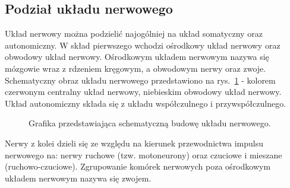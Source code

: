 \documentclass[twoside,a4paper]{book}
\begin{document}
\subsection{Podział układu nerwowego}
Układ nerwowy można podzielić najogólniej na układ somatyczny oraz autonomiczny. W skład pierwszego wchodzi ośrodkowy układ nerwowy oraz obwodowy układ nerwowy. Ośrodkowym układem nerwowym nazywa się mózgowie wraz z rdzeniem kręgowym, a obwodowym nerwy oraz zwoje. Schematyczny obraz układu nerwowego przedstawiono na rys.~\ref{fig:nervesystem} - kolorem czerwonym centralny układ nerwowy, niebieskim obwodowy układ nerwowy. Układ autonomiczny składa się z układu współczulnego i przywspółczulnego. \\
\begin{figure}[!h]

		\centering		
		\caption{Grafika przedstawiająca schematyczną budowę układu nerwowego. }
		\label{fig:nervesystem}
	\end{figure}
	
Nerwy z kolei dzieli się ze względu na kierunek przewodnictwa impulsu nerwowego na: nerwy ruchowe (tzw. motoneurony) oraz czuciowe i mieszane (ruchowo-czuciowe). Zgrupowanie komórek nerwowych poza ośrodkowym układem nerwowym nazywa się zwojem. 

	
	
\end{document}
